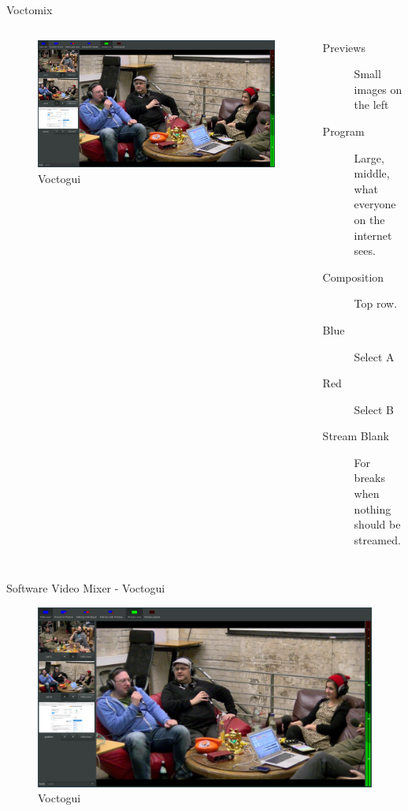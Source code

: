 \documentclass[aspectratio=169]{beamer}
\begin{document}
\begin{frame}{Voctomix}
	\begin{columns}[T,onlytextwidth]
	\begin{figure} 
		\centering
		\includegraphics[width=1\textwidth]{images/voctomix.png}
		\caption{Voctogui}
		\label{fig:voctogui1}
	\end{figure}

	\begin{description}
		\item[Previews] Small images on the left 
		\item[Program] Large, middle, what everyone on the internet sees.
		\item[Composition] Top row.
		\item[Blue] Select A
		\item[Red] Select B
		\item[Stream Blank] For breaks when nothing should be streamed.
     \end{description}
	\end{columns}
\end{frame}

\begin{frame}{Software Video Mixer - Voctogui}
	\begin{figure} 
		\centering
		\includegraphics[width=.9\textwidth]{images/voctomix.png}
		\caption{Voctogui}
	\end{figure}
\end{frame}
\end{document}
